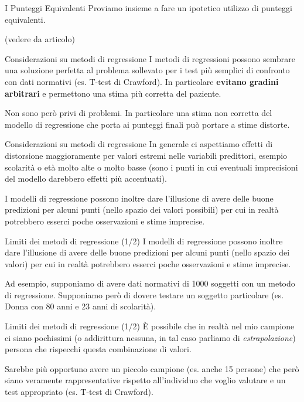 \documentclass[
  ignorenonframetext,
  aspectratio=169,
]{beamer}
\begin{document}
\begin{frame}{I Punteggi Equivalenti}
\label{i-punteggi-equivalenti-12}
Proviamo insieme a fare un ipotetico utilizzo di punteggi equivalenti.

(vedere da articolo)
\end{frame}

\begin{frame}{Considerazioni su metodi di regressione}
\label{considerazioni-su-metodi-di-regressione}
I metodi di regressioni possono sembrare una soluzione perfetta al
problema sollevato per i test più semplici di confronto con dati
normativi (es. T-test di Crawford). In particolare \textbf{evitano
gradini arbitrari} e permettono una stima più corretta del paziente.

Non sono però privi di problemi. In particolare una stima non corretta
del modello di regressione che porta ai punteggi finali può portare a
stime distorte.
\end{frame}

\begin{frame}{Considerazioni su metodi di regressione}
\label{considerazioni-su-metodi-di-regressione-1}
In generale ci aspettiamo effetti di distorsione maggioramente per
valori estremi nelle variabili predittori, esempio scolarità o età molto
alte o molto basse (sono i punti in cui eventuali imprecisioni del
modello darebbero effetti più accentuati).

I modelli di regressione possono inoltre dare l'illusione di avere delle
buone predizioni per alcuni punti (nello spazio dei valori possibili)
per cui in realtà potrebbero esserci poche osservazioni e stime
imprecise.
\end{frame}

\begin{frame}{Limiti dei metodi di regressione (1/2)}
\label{limiti-dei-metodi-di-regressione-12}
I modelli di regressione possono inoltre dare l'illusione di avere delle
buone predizioni per alcuni punti (nello spazio dei valori) per cui in
realtà potrebbero esserci poche osservazioni e stime imprecise.

Ad esempio, supponiamo di avere dati normativi di 1000 soggetti con un
metodo di regressione. Supponiamo però di dovere testare un soggetto
particolare (es. Donna con 80 anni e 23 anni di scolarità).
\end{frame}

\begin{frame}{Limiti dei metodi di regressione (1/2)}
\label{limiti-dei-metodi-di-regressione-12-1}
È possibile che in realtà nel mio campione ci siano pochissimi (o
addirittura nessuna, in tal caso parliamo di \emph{estrapolazione})
persona che rispecchi questa combinazione di valori.

Sarebbe più opportuno avere un piccolo campione (es. anche 15 persone)
che però siano veramente rappresentative rispetto all'individuo che
voglio valutare e un test appropriato (es. T-test di Crawford).
\end{frame}
\end{document}
